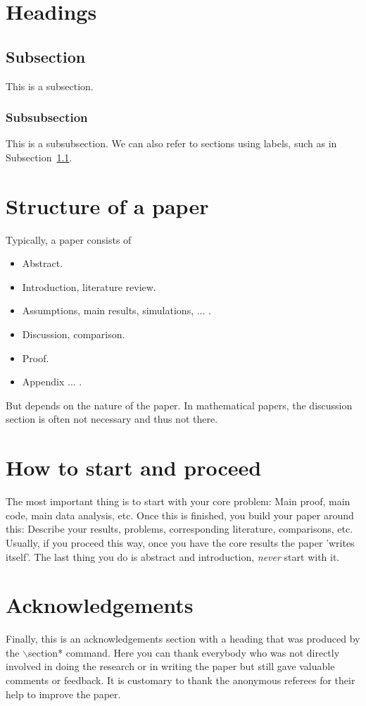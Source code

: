\documentclass[aodsor,preprint]{imsart}
\numberwithin{equation}{section}
\theoremstyle{plain}
\begin{document}
\section{Headings}

\subsection{Subsection}
\label{sec:Sub}
This is a subsection.

\subsubsection{Subsubsection}
This is a subsubsection. We can also refer to sections using labels, such as in Subsection~\ref{sec:Sub}.



\section{Structure of a paper}

Typically, a paper consists of
\begin{itemize}
  \item Abstract.
  \item Introduction, literature review.
  \item Assumptions, main results, simulations, ... .
  \item Discussion, comparison.
  \item Proof.
  \item Appendix ... .
\end{itemize}

But depends on the nature of the paper. In mathematical papers, the discussion section is often not necessary and thus not there.


\section{How to start and proceed}

The most important thing is to start with your core problem: Main proof, main code, main data analysis, etc. Once this is
finished, you build your paper around this: Describe your results, problems, corresponding literature, comparisons, etc.
Usually, if you proceed this way, once you have the core results the paper 'writes itself'. The last thing you do
is abstract and introduction, \textit{never} start with it.

\section*{Acknowledgements}
Finally, this is an acknowledgements section with a heading that was produced by the
$\backslash$section* command. Here you can thank everybody who was not directly involved in doing the research or in writing the paper but still gave valuable comments or feedback. It is customary to thank the anonymous referees for their help to improve the paper.
\end{document}
